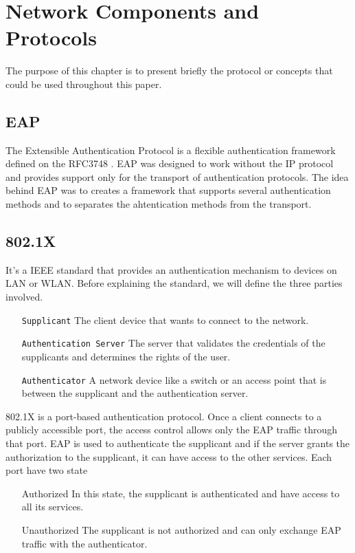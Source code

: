 
\chapter{Network Components and Protocols} %

\label{Chapter3} %


The purpose of this chapter is to present briefly the protocol or concepts that could be used throughout this paper.
\section{EAP}
The Extensible Authentication Protocol is a flexible authentication framework defined on the RFC3748 \cite{rfc3748}. EAP was designed to work without the IP protocol and provides support only for the transport of authentication protocols. The idea behind EAP was to creates a framework that supports several authentication methods and to separates the ahtentication methods from the transport.

\section{802.1X}
It's a IEEE standard that provides an authentication mechanism to devices on LAN or WLAN. Before explaining the standard, we will define the three parties involved.
\begin{itemize}
	\item[\texttt{Supplicant}] The client device that wants to connect to the network.
	\item[\texttt{Authentication Server}] The server that validates the credentials of the supplicants and determines the rights of the user.
	\item[\texttt{Authenticator}] A network device like a switch or an access point that is between the supplicant and the authentication server.
\end{itemize} 
802.1X is a port-based authentication protocol. Once a client connects to a publicly accessible port, the access control allows only the EAP traffic through that port. EAP is used to authenticate the supplicant and if the server grants the authorization to the supplicant, it can have access to the other services.
Each port have two state
\begin{itemize}
\item[Authorized] In this state, the supplicant is authenticated and have access to all its services.
\item[Unauthorized] The supplicant is not authorized and can only exchange EAP traffic with the authenticator.
\end{itemize}

